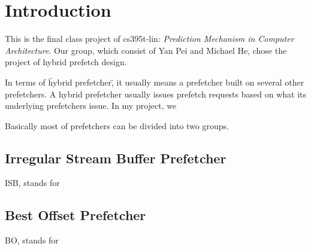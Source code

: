 \section{Introduction}
\label{sec:intro}

This is the final class project of cs395t-lin: \emph{Prediction Mechanism in Computer Architecture}. Our group, which consist of Yan Pei and Michael He, chose the project of hybrid prefetch design.

In terms of \"hybrid prefetcher\", it usually means a prefetcher built on several other prefetchers. A hybrid prefetcher usually issues prefetch requests based on what its underlying prefetchers issue. In my project, we

Basically most of prefetchers can be divided into two groups.\cite{isbpaper}


  \subsection{Irregular Stream Buffer Prefetcher}
  \label{sec:isbintro}

  ISB, stands for

  \subsection{Best Offset Prefetcher}
  \label{sec:bointro}
  BO, stands for
